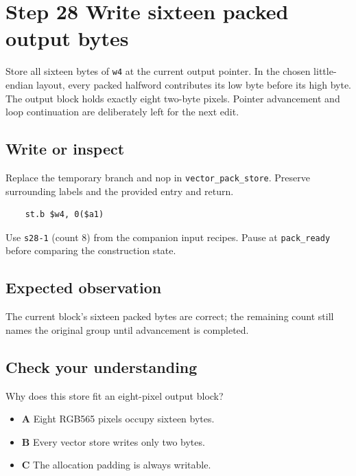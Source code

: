 \section{Step 28 Write sixteen packed output bytes}\label{rgb-s28}

Store all sixteen bytes of \texttt{w4} at the current output pointer. In the chosen little-endian layout, every packed halfword contributes its low byte before its high byte. The output block holds exactly eight two-byte pixels. Pointer advancement and loop continuation are deliberately left for the next edit.

\subsection{Write or inspect}
Replace the temporary branch and nop in \texttt{vector\_pack\_store}. Preserve surrounding labels and the provided entry and return.

\begin{verbatim}
    st.b $w4, 0($a1)
\end{verbatim}
Use \texttt{s28-1} (count 8) from the companion input recipes. Pause at \texttt{pack\_ready} before comparing the construction state.

\subsection{Expected observation}
The current block's sixteen packed bytes are correct; the remaining count still names the original group until advancement is completed.

\subsection{Check your understanding}
Why does this store fit an eight-pixel output block?

\begin{itemize}
  \item \textbf{A} Eight RGB565 pixels occupy sixteen bytes.
  \item \textbf{B} Every vector store writes only two bytes.
  \item \textbf{C} The allocation padding is always writable.
\end{itemize}
